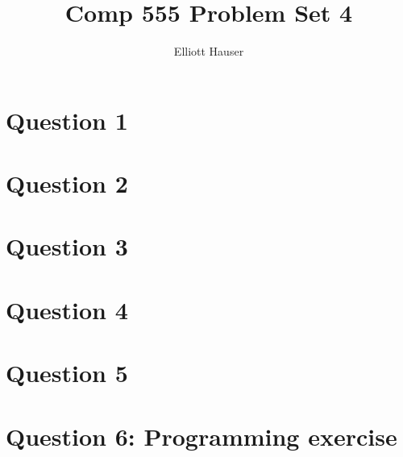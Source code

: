 \documentclass[12pt]{article}
\author{Elliott Hauser}
\title{Comp 555 Problem Set 4}
\begin{document}
\maketitle
\section*{Question 1}

\section*{Question 2}

\section*{Question 3}

\section*{Question 4}

\section*{Question 5}

\section*{Question 6: Programming exercise}
\end{document}
